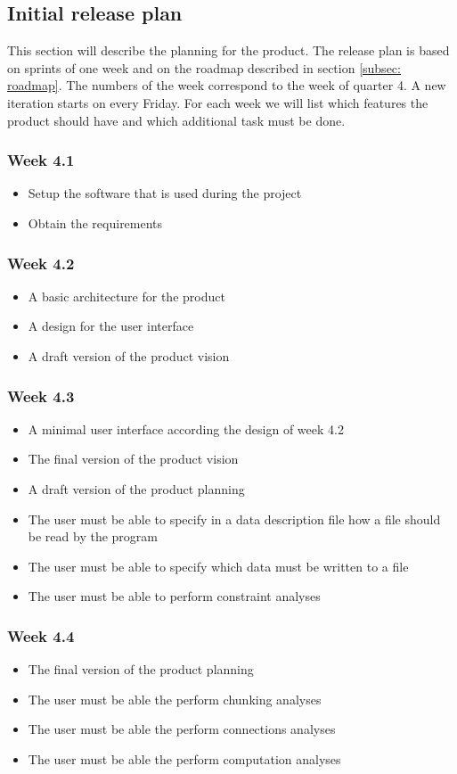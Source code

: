 \subsection{Initial release plan}
\label{subsec: release-plan}
This section will describe the planning for the product. The release plan is based on sprints of one week and on the roadmap described in section \ref{subsec: roadmap}. The numbers of the week correspond to the week of quarter 4. A new iteration starts on every Friday. For each week we will list which features the product should have and which additional task must be done.
\subsubsection{Week 4.1}
\begin{itemize}
	\item Setup the software that is used during the project
	\item Obtain the requirements
\end{itemize}

\subsubsection{Week 4.2}
\begin{itemize}
\item A basic architecture for the product
\item A design for the user interface
\item A draft version of the product vision
\end{itemize}
\subsubsection{Week 4.3}
\begin{itemize}
	\item A minimal user interface according the design of week 4.2
	\item The final version of the product vision
	\item A draft version of the product planning
	\item The user must be able to specify in a data description file how a file should be read by the program
	\item The user must be able to specify which data must be written to a file
	\item The user must be able to perform constraint analyses
\end{itemize}
\subsubsection{Week 4.4}
\begin{itemize}
	\item The final version of the product planning
	\item The user must be able the perform chunking analyses
	\item The user must be able the perform connections analyses
	\item The user must be able the perform computation analyses
\end{itemize}
